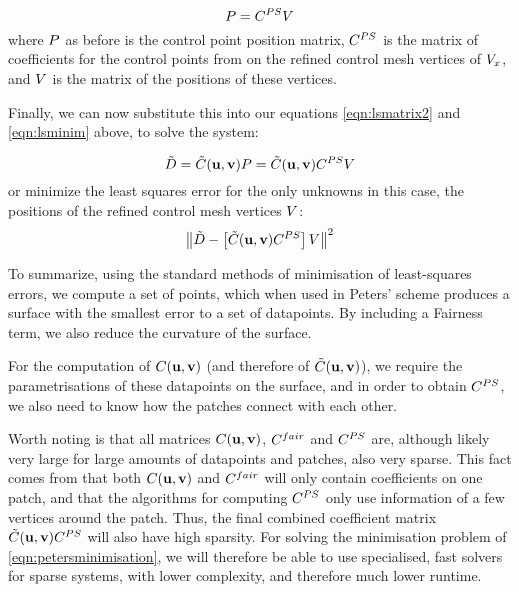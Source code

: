 \begin{equation}
\lsControlPointMatrix = \petersControlPointCoefMatrix\petersPatchPointMatrix
\end{equation}
where $\lsControlPointMatrix$ as before is the \Bez control point position matrix, $\petersControlPointCoefMatrix$ is the matrix of coefficients for the \Bez control points from on the refined control mesh vertices of $\petersPatchPoints$, and $\petersPatchPointMatrix$ is the matrix of the positions of these vertices. 

Finally, we can now substitute this into our equations \ref{eqn:lsmatrix2} and \ref{eqn:lsminim} above, to solve the system:

\begin{equation}
\lsDataPointConcMatrix = \lsControlCoefConcMatrix(\vec{u},\vec{v})\lsControlPointMatrix = \lsControlCoefConcMatrix(\vec{u},\vec{v})\petersControlPointCoefMatrix\petersPatchPointMatrix
\end{equation}
or minimize the least squares error for the only unknowns in this case, the positions of the refined control mesh vertices $\petersPatchPointMatrix$:
\begin{equation}
\norm{\lsDataPointConcMatrix - \left [\lsControlCoefConcMatrix(\vec{u},\vec{v})\petersControlPointCoefMatrix\right ]\petersPatchPointMatrix}^2
\label{eqn:petersminimisation}
\end{equation}

To summarize, using the standard methods of minimisation of least-squares errors, we compute a set of points, which when used in Peters' scheme produces a surface with the smallest error to a set of datapoints. By including a Fairness term, we also reduce the curvature of the surface.

For the computation of  $\lsControlPointCoefMatrix(\vec{u},\vec{v})$ (and therefore of $\lsControlCoefConcMatrix(\vec{u},\vec{v})$), we require the parametrisations of these datapoints on the surface, and in order to obtain $\petersControlPointCoefMatrix$, we also need to know how the patches connect with each other. 

Worth noting is that all matrices $\lsControlPointCoefMatrix(\vec{u},\vec{v})$, $\lsControlPointCoefMatrix^{fair}$ and $\petersControlPointCoefMatrix$ are, although likely very large for large amounts of datapoints and patches, also very sparse. This fact comes from that both $\lsControlPointCoefMatrix(\vec{u},\vec{v})$ and $\lsControlPointCoefMatrix^{fair}$ will only contain coefficients on one patch, and that the algorithms for computing $\petersControlPointCoefMatrix$ only use information of a few vertices around the patch. Thus, the final combined coefficient matrix $\lsControlCoefConcMatrix(\vec{u},\vec{v})\petersControlPointCoefMatrix$ will also have high sparsity. For solving the minimisation problem of \autoref{eqn:petersminimisation}, we will therefore be able to use specialised, fast solvers for sparse systems, with lower complexity, and therefore much lower runtime.
